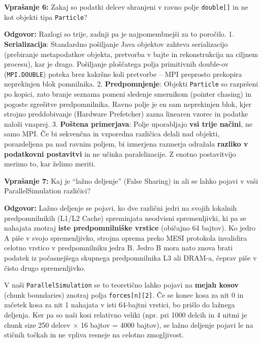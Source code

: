 \documentclass[11pt,a4paper]{article}
\begin{document}
\begin{vprasanje}
\textbf{Vprašanje 6:} Zakaj so podatki delcev shranjeni v ravno polje \texttt{double[]} in ne kot objekti tipa \texttt{Particle}?

\textbf{Odgovor:}
Razlogi so trije, zadnji pa je najpomembnej\v{s}i za to poro\v{c}ilo.
1. \textbf{Serializacija}: Standardno pošiljanje Java objektov zahteva serializacijo (prebiranje metapodatkov objekta, pretvorba v bajte in rekonstrukcija na ciljnem procesu), kar je drago. Pošiljanje plo\v{s}\v{c}atega polja primitivnih double-ov (\texttt{MPI.DOUBLE}) poteka brez kakršne koli pretvorbe -- MPI preprosto prekopira neprekinjen blok pomnilnika.
2. \textbf{Predpomnjenje}: Objekti \texttt{Particle} so razpr\v{s}eni po kopici, zato branje seznama pomeni sledenje smernikom (pointer chasing) in pogoste zgre\v{s}itve predpomnilnika. Ravno polje je en sam neprekinjen blok, kjer strojno preddobivanje (Hardware Prefetcher) zazna linearen vzorec in podatke nalo\v{z}i vnaprej.
3. \textbf{Po\v{s}tena primerjava}: Polje uporabljajo \textbf{vsi trije na\v{c}ini}, ne samo MPI. \v{C}e bi sekven\v{c}na in vzporedna razli\v{c}ica delali nad objekti, porazdeljena pa nad ravnim poljem, bi izmerjena razmerja odra\v{z}ala \textbf{razliko v podatkovni postavitvi} in ne u\v{c}inka paralelizacije. Z enotno postavitvijo merimo to, kar \v{z}elimo meriti.
\end{vprasanje}

\begin{vprasanje}
\textbf{Vprašanje 7:} Kaj je ``lažno deljenje'' (False Sharing) in ali se lahko pojavi v vaši ParallelSimulation različici?

\textbf{Odgovor:}
Lažno deljenje se pojavi, ko dve različni jedri na svojih lokalnih predpomnilnikih (L1/L2 Cache) spreminjata neodvisni spremenljivki, ki pa se nahajata znotraj \textbf{iste predpomnilniške vrstice} (običajno 64 bajtov). Ko jedro A piše v svojo spremenljivko, strojna oprema preko MESI protokola invalidira celotno vrstico v predpomnilniku jedra B. Jedro B mora nato znova brati podatek iz počasnejšega skupnega predpomnilnika L3 ali DRAM-a, čeprav piše v čisto drugo spremenljivko.

V naši \texttt{ParallelSimulation} se to teoretično lahko pojavi na \textbf{mejah kosov} (chunk boundaries) znotraj polja \texttt{forces[n][2]}. Če se konec kosa za nit 0 in začetek kosa za nit 1 nahajata v isti 64-bajtni vrstici, bo prišlo do lažnega deljenja. Ker pa so naši kosi relativno veliki (npr. pri 1000 delcih in 4 nitmi je chunk size 250 delcev $\times$ 16 bajtov = 4000 bajtov), se lažno deljenje pojavi le na stičnih točkah in ne vpliva resneje na celotno zmogljivost.
\end{vprasanje}
\end{document}
